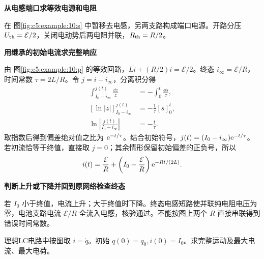\begin{solution}\textbf{从电感端口求等效电源和电阻}\par\nobreak
在 图\ref{fig:c5:example:10:s} 中暂移去电感，另两支路构成端口电源。开路分压 $U_{\rm th}=\mathcal E/2$，关闭电动势后两电阻并联，$R_{\rm th}=R/2$。



\par\medskip{}\noindent\textbf{用继承的初始电流求完整响应}\par\nobreak
由 图\ref{fig:c5:example:10:p} 的等效回路，$L\dot i+(R/2)i=\mathcal E/2$。终态 $i_\infty=\mathcal E/R$，时间常数 $\tau=2L/R$。令 $j=i-i_\infty$，分离积分得
\[
\begin{aligned}
\int_{I_0-i_\infty}^{j(t)}\frac{\dd z}{z}&=-\int_0^t\frac{\dd s}{\tau},\\
[\ln|z|]_{I_0-i_\infty}^{j(t)}&=-\frac1\tau[s]_0^t,\\
\ln\left|\frac{j(t)}{I_0-i_\infty}\right|&=-\frac t\tau.
\end{aligned}
\]
取指数后得到偏差绝对值之比为 $\mathrm e^{-t/\tau}$。结合初始符号，$j(t)=(I_0-i_\infty)\mathrm e^{-t/\tau}$。
若初流恰等于终值，直接取 $j=0$；其余情形保留初始偏差的正负号，所以
\[
 i(t)=\frac{\mathcal E}{R}+\left(I_0-\frac{\mathcal E}{R}\right)\mathrm e^{-Rt/(2L)}.
\]


\par\medskip{}\noindent\textbf{判断上升或下降并回到原网络检查终态}\par\nobreak
若 $I_0$ 小于终值，电流上升；大于终值时下降。终态电感短路使并联纯电阻电压为零，电池支路电流 $\mathcal E/R$ 全流入电感，核验通过。不能按图上两个 $R$ 直接串联得到错误时间常数。\end{solution}
\begin{question}\begin{example}[LC振荡的两个初值]\label{c5:example:11}
理想LC电路中按图取 $i=\dot q$。初始 $q(0)=q_0,i(0)=I_0$。求完整运动及最大电流、最大电荷。
\end{example}
\end{question}
